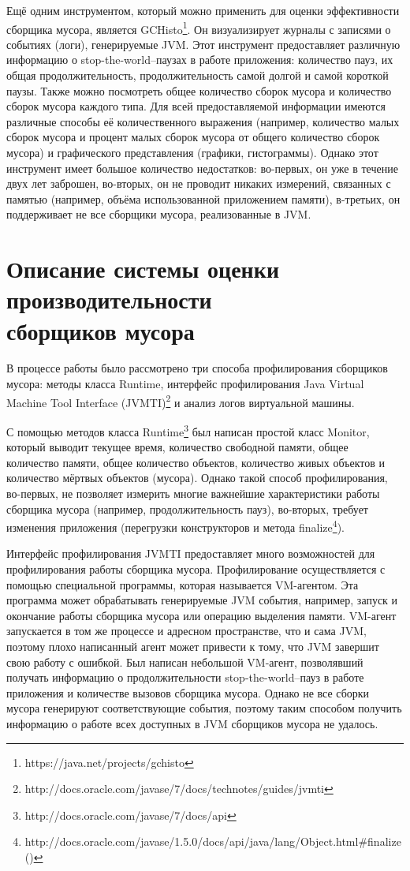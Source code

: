 Ещё одним инструментом, который можно применить для оценки эффективности сборщика мусора,
является GCHisto\footnote{https://java.net/projects/gchisto}. Он визуализирует журналы
с записями о событиях (логи), генерируемые JVM. Этот инструмент предоставляет различную 
информацию о stop-the-world--паузах в работе приложения: количество пауз, их общая продолжительность,
продолжительность самой долгой и самой короткой паузы. Также можно посмотреть общее количество
сборок мусора и количество сборок мусора каждого типа. Для всей предоставляемой информации
имеются различные способы её количественного выражения (например, количество малых сборок мусора
и процент малых сборок мусора от общего количество сборок мусора) и графического представления
(графики, гистограммы). Однако этот инструмент имеет большое количество недостатков:
во-первых, он уже в течение двух лет заброшен, во-вторых, он не проводит никаких
измерений, связанных с памятью (например, объёма использованной приложением памяти), в-третьих,
он поддерживает не все сборщики мусора, реализованные в JVM.

\section{Описание системы оценки производительности\\сборщиков мусора}

В процессе работы было рассмотрено три способа профилирования сборщиков мусора:
методы класса Runtime, интерфейс профилирования Java Virtual Machine Tool Interface
(JVMTI)\footnote{http://docs.oracle.com/javase/7/docs/technotes/guides/jvmti} и анализ
логов виртуальной машины.

С помощью методов класса Runtime\footnote{http://docs.oracle.com/javase/7/docs/api}
был написан простой класс Monitor, который выводит текущее время, количество свободной памяти,
общее количество памяти, общее количество объектов, количество живых объектов и 
количество мёртвых объектов (мусора). Однако такой способ профилирования, во-первых,
не позволяет измерить многие важнейшие характеристики работы сборщика мусора (например, продолжительность
пауз), во-вторых, требует изменения приложения (перегрузки конструкторов и 
метода finalize\footnote{http://docs.oracle.com/javase/1.5.0/docs/api/java/lang/Object.html\#finalize()}).

Интерфейс профилирования JVMTI предоставляет много возможностей для профилирования
работы сборщика мусора. Профилирование осуществляется с помощью специальной программы,
которая называется VM-агентом. Эта программа может обрабатывать генерируемые JVM
события, например, запуск и окончание работы сборщика мусора или операцию выделения
памяти. VM-агент запускается в том же процессе и адресном пространстве, что и сама
JVM, поэтому плохо написанный агент может привести к тому, что JVM завершит свою
работу с ошибкой. Был написан небольшой VM-агент, позволявший получать информацию
о продолжительности stop-the-world--пауз в работе приложения и количестве вызовов сборщика
мусора. Однако не все сборки мусора генерируют соответствующие события, поэтому таким способом получить
информацию о работе всех доступных в JVM сборщиков мусора не удалось.

